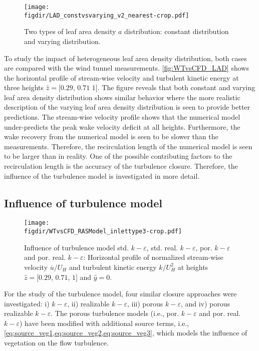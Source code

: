 \begin{figure}[t]
	\centering
	\texttt{[image: \\figdir/LAD\_constvsvarying\_v2\_nearest-crop.pdf]}
	\caption{Two types of leaf area density $a$ distribution:  constant distribution and  varying distribution.}
	\label{fig:LAD_constvsvarying}
\end{figure}

To study the impact of heterogeneous leaf area density distribution, both cases are compared with the wind tunnel measurements. \cref{fig:WTvsCFD_LAD} shows the horizontal profile of  stream-wise velocity and turbulent kinetic energy at three heights $\hat{z} = [0.29$, $0.71$ $1]$.  The figure reveals that both constant and varying leaf area density distribution shows similar behavior where the more realistic description of the varying leaf area density distribution is seen to provide better predictions. The stream-wise velocity profile shows that the numerical model under-predicts the peak wake velocity deficit at all heights. Furthermore, the wake recovery from the numerical model is seen to be slower than the measurements. Therefore, the recirculation length of the numerical model is seen to be larger than in reality. One of the possible contributing factors to the recirculation length is the accuracy of the turbulence closure. Therefore, the influence of the turbulence model is investigated in more detail. 

\subsection{Influence of turbulence model}
\label{subsec:turbmodel}
	
	\begin{figure}[p]
		\centering
		\texttt{[image: \\figdir/WTvsCFD\_RASModel\_inlettype3-crop.pdf]}
		\caption{Influence of turbulence model std. $k-\varepsilon$, std. real. $k-\varepsilon$, por. $k-\varepsilon$ and por. real. $k-\varepsilon$: Horizontal profile of normalized stream-wise velocity $\overline{u}/U_H$ and turbulent kinetic energy $k/U_H^2$ at heights $\hat{z} = [0.29$, $0.71$, $1]$ and $\hat{y}=0$.}
		\label{fig:WTvsCFD_RASModel}
	\end{figure}
		
For the study of the turbulence model, four similar closure approaches were investigated: i) $k-\varepsilon$, ii) realizable $k-\varepsilon$, iii) porous $k-\varepsilon$, and iv) porous realizable $k-\varepsilon$. The porous turbulence models (i.e., por. $k-\varepsilon$ and por. real. $k-\varepsilon$) have been modified with additional source terms, i.e., \cref{eq:source_veg1,eq:source_veg2,eq:source_veg3}, which models the influence of vegetation on the flow turbulence. 


